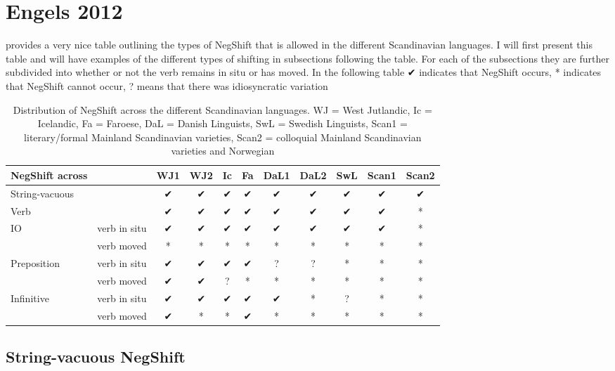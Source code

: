 \documentclass[12pt, letterpaper]{article}
\begin{document}
\section{Engels 2012} \label{sec:ENGELS}

\ea \citet{engelsScandinavianNegativeIndefinites2012} provides a very nice table outlining the types of NegShift that is allowed in the different Scandinavian languages. I will first present this table and will have examples of the different types of shifting in subsections following the table.
\ex For each of the subsections they are further subdivided into whether or not the verb remains in situ or has moved.
\ex In the following table  ✔︎ indicates that NegShift occurs, * indicates that NegShift cannot occur, ? means that there was idiosyncratic  variation 
\z

\begin{table}[h!]
	\centering
	\caption{Distribution of NegShift across the different Scandinavian languages. WJ = West Jutlandic, Ic = Icelandic, Fa = Faroese, DaL = Danish Linguists, SwL = Swedish Linguists, Scan1 = literary/formal Mainland Scandinavian varieties, Scan2 = colloquial Mainland Scandinavian varieties and Norwegian}
\begin{tabular}{llccccccccc}
	\hline 
	NegShift across &  & WJ1 & WJ2 & Ic & Fa & DaL1 & DaL2 & SwL & Scan1 & Scan2 \\ 
	\hline 
	String-vacuous &  & ✔︎ & ✔︎ & ✔︎ & ✔︎ & ✔︎ & ✔︎ & ✔︎ & ✔︎ & ✔︎ \\ 
	Verb &  & ✔︎ & ✔︎ & ✔︎ & ✔︎ & ✔︎ & ✔︎ & ✔︎ & ✔︎ & * \\ 
	IO & verb in situ & ✔︎ & ✔︎ & ✔︎ & ✔︎ & ✔︎ & ✔︎ & ✔︎ & ✔︎ & * \\ 
	& verb moved & * & * & * & * & * & * & * & * & * \\ 
	Preposition & verb in situ & ✔︎ & ✔︎ & ✔︎ & ✔︎ & ? & ? & * & * & * \\ 
	& verb moved & ✔︎ & ✔︎ & ? & * & * & * & * & * & * \\ 
	Infinitive & verb in situ & ✔︎ & ✔︎ & ✔︎ & ✔︎ & ✔︎ & * & ? & * & * \\ 
	& verb moved & ✔︎ & * & * & ✔︎ & * & * & * & * & * \\ 
	\hline 
\end{tabular} 
\end{table}

\subsection{String-vacuous NegShift}
\end{document}

